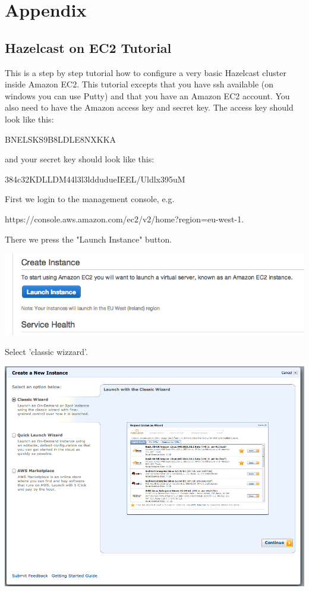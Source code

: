 \chapter*{Appendix}

\section*{Hazelcast on EC2 Tutorial}
This is a step by step tutorial how to configure a very basic Hazelcast cluster inside Amazon EC2. This tutorial excepts that you have ssh available (on windows you can use Putty) and that you have an Amazon EC2 account. You also need to have the Amazon access key and secret key. The access key should look like this: 

BNELSKS9B8LDLE8NXKKA 

and your secret key should look like this:

384c32KDLLDM44l3l3lddudueIEEL/Uldlx395uM

First we login to the management console, e.g. 

https://console.aws.amazon.com/ec2/v2/home?region=eu-west-1. 

There we press the "Launch Instance" button.

\includegraphics[scale=0.30]{ec2-0.png}

Select 'classic wizzard'.

\includegraphics[scale=0.30]{ec2-1.png}

